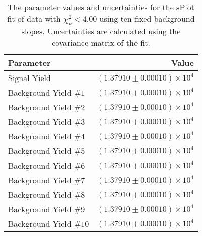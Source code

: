 
\begin{table}[h]
    \begin{center}
        \begin{tabular}{lr}\toprule
            Parameter & Value \\\midrule
            Signal Yield & $(1.37910 \pm 0.00010) \times 10^{4}$ \\
            Background Yield $\#1$ & $(1.37910 \pm 0.00010) \times 10^{4}$ \\
            Background Yield $\#2$ & $(1.37910 \pm 0.00010) \times 10^{4}$ \\
            Background Yield $\#3$ & $(1.37910 \pm 0.00010) \times 10^{4}$ \\
            Background Yield $\#4$ & $(1.37910 \pm 0.00010) \times 10^{4}$ \\
            Background Yield $\#5$ & $(1.37910 \pm 0.00010) \times 10^{4}$ \\
            Background Yield $\#6$ & $(1.37910 \pm 0.00010) \times 10^{4}$ \\
            Background Yield $\#7$ & $(1.37910 \pm 0.00010) \times 10^{4}$ \\
            Background Yield $\#8$ & $(1.37910 \pm 0.00010) \times 10^{4}$ \\
            Background Yield $\#9$ & $(1.37910 \pm 0.00010) \times 10^{4}$ \\
            Background Yield $\#10$ & $(1.37910 \pm 0.00010) \times 10^{4}$ \\\bottomrule
        \end{tabular}
        \caption{The parameter values and uncertainties for the sPlot fit of data with $\chi^2_\nu < 4.00$ using ten fixed background slopes. Uncertainties are calculated using the covariance matrix of the fit.}
    \end{center}
\end{table}
